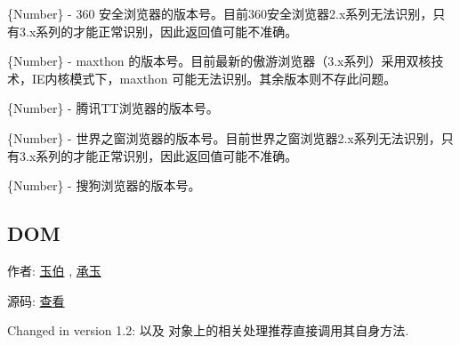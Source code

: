 \documentclass[letterpaper,10pt,english]{sphinxmanual}
\begin{document}

\begin{fulllineitems}
\label{api/core/ua/index:UA.se360}
\{Number\} - 360 安全浏览器的版本号。目前360安全浏览器2.x系列无法识别，只有3.x系列的才能正常识别，因此返回值可能不准确。

\end{fulllineitems}



\begin{fulllineitems}
\label{api/core/ua/index:UA.maxthon}
\{Number\} - maxthon 的版本号。目前最新的傲游浏览器（3.x系列）采用双核技术，IE内核模式下，maxthon 可能无法识别。其余版本则不存此问题。

\end{fulllineitems}



\begin{fulllineitems}
\label{api/core/ua/index:UA.tt}
\{Number\} - 腾讯TT浏览器的版本号。

\end{fulllineitems}



\begin{fulllineitems}
\label{api/core/ua/index:UA.theworld}
\{Number\} - 世界之窗浏览器的版本号。目前世界之窗浏览器2.x系列无法识别，只有3.x系列的才能正常识别，因此返回值可能不准确。

\end{fulllineitems}



\begin{fulllineitems}
\label{api/core/ua/index:UA.sougou}
\{Number\} - 搜狗浏览器的版本号。

\end{fulllineitems}

\label{api/core/dom/index:module-DOM}

\subsection{DOM}
\label{api/core/dom/index::doc}\label{api/core/dom/index:dom}
\begin{DUlineblock}{0em}
\item[] 作者: \href{mailto:lifesinger@gmail.com}{玉伯} , \href{mailto:yiminghe@gmail.com}{承玉}
\item[] 源码: \href{https://github.com/kissyteam/kissy/tree/master/src/dom}{查看}
\end{DUlineblock}
Changed in version 1.2: {\hyperref[api/core/node/index:module-Node]{}} 以及  {\hyperref[api/core/node/nodelist:Node.NodeList]{}} 对象上的相关处理推荐直接调用其自身方法.
\end{document}
